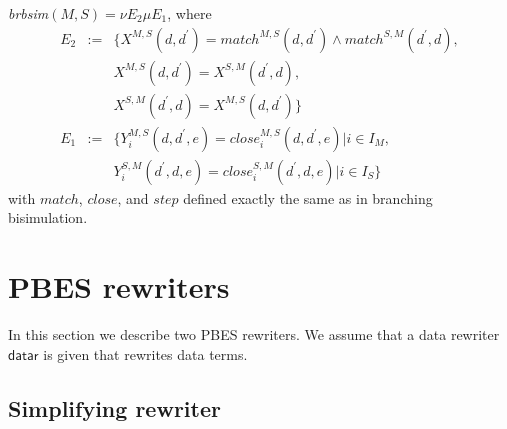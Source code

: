 \documentclass{article}
\begin{document}
\emph{brbsim}$(M,S)=\nu E_{2}\mu E_{1}$, where%
\begin{equation*}
\begin{array}{ccl}
E_{2} & := & \{X^{M,S}(d,d^{\prime })=match^{M,S}(d,d^{\prime })\wedge
match^{S,M}(d^{\prime },d), \\
&  & X^{M,S}(d,d^{\prime })=X^{S,M}(d^{\prime },d), \\
&  & X^{S,M}(d^{\prime },d)=X^{M,S}(d,d^{\prime })\} \\
E_{1} & := & \{Y_{i}^{M,S}(d,d^{\prime },e)=close_{i}^{M,S}(d,d^{\prime
},e)|i\in I_{M}, \\
&  & Y_{i}^{S,M}(d^{\prime },d,e)=close_{i}^{S,M}(d^{\prime },d,e)|i\in
I_{S}\}%
\end{array}%
\end{equation*}%
with $match$, $close$, and $step$ defined exactly the same as in branching
bisimulation.\newpage

\section{PBES rewriters}

In this section we describe two PBES rewriters. We assume that a data
rewriter $\mathsf{datar}$ is given that rewrites data terms.

\subsection{Simplifying rewriter}
\end{document}
